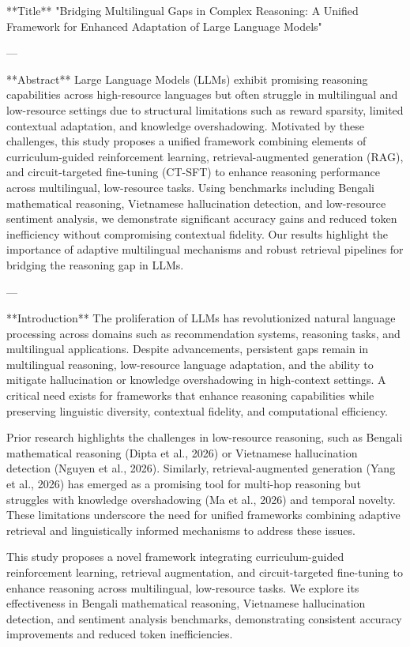 **Title**  
"Bridging Multilingual Gaps in Complex Reasoning: A Unified Framework for Enhanced Adaptation of Large Language Models"

---

**Abstract**  
Large Language Models (LLMs) exhibit promising reasoning capabilities across high-resource languages but often struggle in multilingual and low-resource settings due to structural limitations such as reward sparsity, limited contextual adaptation, and knowledge overshadowing. Motivated by these challenges, this study proposes a unified framework combining elements of curriculum-guided reinforcement learning, retrieval-augmented generation (RAG), and circuit-targeted fine-tuning (CT-SFT) to enhance reasoning performance across multilingual, low-resource tasks. Using benchmarks including Bengali mathematical reasoning, Vietnamese hallucination detection, and low-resource sentiment analysis, we demonstrate significant accuracy gains and reduced token inefficiency without compromising contextual fidelity. Our results highlight the importance of adaptive multilingual mechanisms and robust retrieval pipelines for bridging the reasoning gap in LLMs.

---

**Introduction**  
The proliferation of LLMs has revolutionized natural language processing across domains such as recommendation systems, reasoning tasks, and multilingual applications. Despite advancements, persistent gaps remain in multilingual reasoning, low-resource language adaptation, and the ability to mitigate hallucination or knowledge overshadowing in high-context settings. A critical need exists for frameworks that enhance reasoning capabilities while preserving linguistic diversity, contextual fidelity, and computational efficiency.

Prior research highlights the challenges in low-resource reasoning, such as Bengali mathematical reasoning (Dipta et al., 2026) or Vietnamese hallucination detection (Nguyen et al., 2026). Similarly, retrieval-augmented generation (Yang et al., 2026) has emerged as a promising tool for multi-hop reasoning but struggles with knowledge overshadowing (Ma et al., 2026) and temporal novelty. These limitations underscore the need for unified frameworks combining adaptive retrieval and linguistically informed mechanisms to address these issues.

This study proposes a novel framework integrating curriculum-guided reinforcement learning, retrieval augmentation, and circuit-targeted fine-tuning to enhance reasoning across multilingual, low-resource tasks. We explore its effectiveness in Bengali mathematical reasoning, Vietnamese hallucination detection, and sentiment analysis benchmarks, demonstrating consistent accuracy improvements and reduced token inefficiencies.

